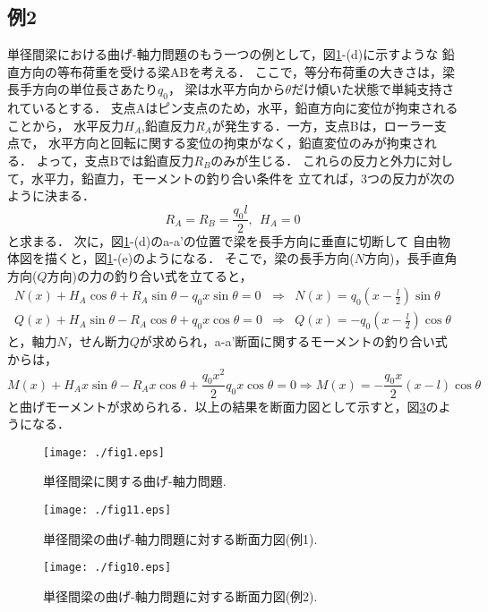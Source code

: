 \documentclass[10pt,a4j]{jarticle}
\begin{document}
\subsection{例2}
単径間梁における曲げ-軸力問題のもう一つの例として，図\ref{fig:fig12_1}-(d)に示すような
鉛直方向の等布荷重を受ける梁ABを考える．
ここで，等分布荷重の大きさは，梁長手方向の単位長さあたり$q_0$，
梁は水平方向から$\theta$だけ傾いた状態で単純支持されているとする．
支点Aはピン支点のため，水平，鉛直方向に変位が拘束されることから，
水平反力$H_A$,鉛直反力$R_A$が発生する．一方，支点Bは，ローラー支点で，
水平方向と回転に関する変位の拘束がなく，鉛直変位のみが拘束される．
よって，支点Bでは鉛直反力$R_B$のみが生じる．
これらの反力と外力に対して，水平力，鉛直力，モーメントの釣り合い条件を
立てれば，3つの反力が次のように決まる．
\begin{equation}
	R_A=R_B=\frac{q_0l}{2}, \ \ H_A=0
\end{equation}
と求まる．
次に，図\ref{fig:fig12_1}-(d)のa-a'の位置で梁を長手方向に垂直に切断して
自由物体図を描くと，図\ref{fig:fig12_1}-(e)のようになる．
そこで，梁の長手方向($N$方向)，長手直角方向($Q$方向)の力の釣り合い式を立てると，
\begin{eqnarray}
	N(x)+H_A\cos\theta +R_A\sin\theta - q_0x\sin \theta =0 
	& \Rightarrow  & 
	N(x)=q_0\left(x-\frac{l}{2}\right)\sin\theta
	\\
	Q(x)+H_A\sin\theta -R_A\cos\theta +q_0x\cos \theta =0 
	& \Rightarrow  &  
	Q(x)=-q_0\left(x-\frac{l}{2}\right) \cos\theta	
\end{eqnarray}
と，軸力$N$，せん断力$Q$が求められ，a-a'断面に関するモーメントの釣り合い式からは，
\begin{equation}
	M(x)+H_Ax\sin\theta -R_Ax\cos\theta +\frac{q_0x^2}{2}q_0x\cos \theta =0 
	\Rightarrow    
	M(x)=-\frac{q_0x}{2}\left(x-l\right)\cos\theta
\end{equation}
と曲げモーメントが求められる．以上の結果を断面力図として示すと，図\ref{fig:fig12_1_2}のようになる．
\begin{figure}[h]
	\begin{center}
	\texttt{[image: ./fig1.eps]} 
	\end{center}
	\caption{
		単径間梁に関する曲げ-軸力問題.
	} 
	\label{fig:fig12_1}
\end{figure}
\begin{figure}[h]
	\begin{center}
	\texttt{[image: ./fig11.eps]} 
	\end{center}
	\caption{
		単径間梁の曲げ-軸力問題に対する断面力図(例1).
	} 
	\label{fig:fig12_1_1}
\end{figure}
\begin{figure}[h]
	\begin{center}
	\texttt{[image: ./fig10.eps]} 
	\end{center}
	\caption{
		単径間梁の曲げ-軸力問題に対する断面力図(例2).
	} 
	\label{fig:fig12_1_2}
\end{figure}
\end{document}
